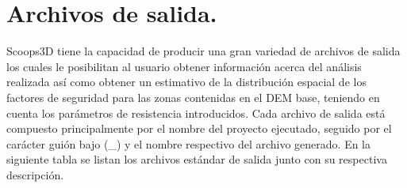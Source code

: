 	\section{Archivos de salida.}
\label{chap: archivos de salida}
Scoops3D tiene la capacidad de producir una gran variedad de archivos de salida los
cuales le posibilitan al usuario obtener informaci\'{o}n acerca del an\'alisis realizada as\'{i} como
obtener un estimativo de la distribuci\'{o}n espacial de los factores de seguridad para las zonas
contenidas en el DEM base, teniendo en cuenta los par\'{a}metros de resistencia introducidos.
Cada archivo de salida est\'{a} compuesto principalmente por el nombre del proyecto ejecutado, seguido por el car\'{a}cter gui\'{o}n bajo (\_) y el nombre respectivo del archivo generado.
En la siguiente tabla se listan los archivos est\'{a}ndar de salida junto con su respectiva descripci\'{o}n.


